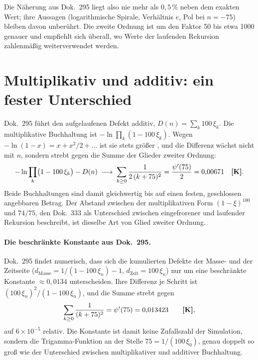 Die Näherung aus Dok.~295 liegt also nie mehr als $0{,}5\,\%$ neben dem exakten
Wert; ihre Aussagen (logarithmische Spirale, Verhältnis $e$, Pol bei $n=-75$)
bleiben davon unberührt. Die zweite Ordnung ist um den Faktor 50 bis etwa 1000 genauer
und empfiehlt sich überall, wo Werte der laufenden Rekursion zahlenmäßig
weiterverwendet werden.

\section{Multiplikativ und additiv: ein fester Unterschied}

Dok.~295 führt den aufgelaufenen Defekt additiv, $D(n)=\sum_k100\,\xi_k$. Die
multiplikative Buchhaltung ist $-\ln\prod_k(1-100\,\xi_k)$. Wegen
$-\ln(1-x)=x+x^2/2+\dots$ ist sie stets größer \KM, und die Differenz wächst nicht
mit $n$, sondern strebt gegen die Summe der Glieder zweiter Ordnung:
\begin{equation}
  -\ln\prod_{k}\bigl(1-100\,\xi_k\bigr)-D(n)\;\longrightarrow\;
  \sum_{k\ge0}\frac{1}{2\,(k+75)^2}=\frac{\psi'(75)}{2}=0{,}00671 \quad\textbf{[K]}.
\end{equation}
Beide Buchhaltungen sind damit gleichwertig bis auf einen festen, geschlossen
angebbaren Betrag. Der Abstand zwischen der multiplikativen Form $(1-\xi)^{100}$ und
$74/75$, den Dok.~333 als Unterschied zwischen eingefrorener und laufender Rekursion
beschreibt, ist dieselbe Art von Glied zweiter Ordnung.

\paragraph{Die beschränkte Konstante aus Dok.~295.}
Dok.~295 findet numerisch, dass sich die kumulierten Defekte der Masse- und der
Zeitseite ($d_\text{Masse}=1/(1-100\,\xi_n)-1$, $d_\text{Zeit}=100\,\xi_n$) nur um
eine beschränkte Konstante $\approx0{,}0134$ unterscheiden. Ihre Differenz je
Schritt ist $(100\,\xi_n)^2/(1-100\,\xi_n)$, und die Summe strebt gegen
\begin{equation}
  \sum_{k\ge0}\frac{1}{(k+75)^2}=\psi'(75)=0{,}013423 \qquad\textbf{[K]},
\end{equation}
auf $6\times10^{-5}$ relativ. Die Konstante ist damit keine Zufallszahl der
Simulation, sondern die Trigamma-Funktion an der Stelle $75=1/(100\,\xi_0)$,
genau doppelt so groß wie der Unterschied zwischen multiplikativer und additiver
Buchhaltung.

